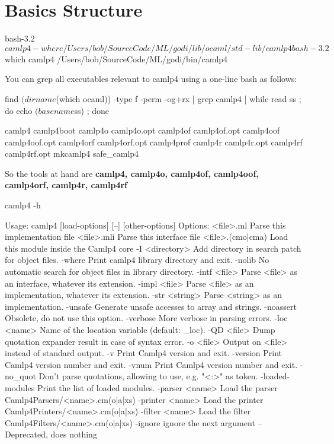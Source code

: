 \section{Basics Structure}


\begin{alternate}
bash-3.2$ camlp4 -where
/Users/bob/SourceCode/ML/godi/lib/ocaml/std-lib/camlp4
bash-3.2$ which camlp4
/Users/bob/SourceCode/ML/godi/bin/camlp4
\end{alternate}


You can grep all executables relevant to camlp4 using a one-line bash
as follows:
\begin{bluetext}
find $(dirname $(which ocaml)) -type f -perm -og+rx | grep camlp4 |
while read ss ; do echo $(basename $ss) ; done
\end{bluetext}

\begin{bluetext}  
camlp4
camlp4boot
camlp4o
camlp4o.opt
camlp4of
camlp4of.opt
camlp4oof
camlp4oof.opt
camlp4orf
camlp4orf.opt
camlp4prof
camlp4r
camlp4r.opt
camlp4rf
camlp4rf.opt
mkcamlp4
safe_camlp4
\end{bluetext}

So the tools at hand are \textbf{camlp4, camlp4o, camlp4of, camlp4oof,
  camlp4orf, camlp4r, camlp4rf }

\begin{bluetext}
camlp4 -h

Usage: camlp4 [load-options] [--] [other-options]
Options:
<file>.ml        Parse this implementation file
<file>.mli       Parse this interface file
<file>.(cmo|cma) Load this module inside the Camlp4 core
  -I <directory>   Add directory in search patch for object files.
  -where           Print camlp4 library directory and exit.
  -nolib           No automatic search for object files in library directory.
  -intf <file>     Parse <file> as an interface, whatever its extension.
  -impl <file>     Parse <file> as an implementation, whatever its extension.
  -str <string>    Parse <string> as an implementation.
  -unsafe          Generate unsafe accesses to array and strings.
  -noassert        Obsolete, do not use this option.
  -verbose         More verbose in parsing errors.
  -loc <name>      Name of the location variable (default: _loc).
  -QD <file>       Dump quotation expander result in case of syntax error.
  -o <file>        Output on <file> instead of standard output.
  -v               Print Camlp4 version and exit.
  -version         Print Camlp4 version number and exit.
  -vnum            Print Camlp4 version number and exit.
  -no_quot         Don't parse quotations, allowing to use, e.g. "<:>" as token.
  -loaded-modules  Print the list of loaded modules.
  -parser <name>   Load the parser Camlp4Parsers/<name>.cm(o|a|xs)
  -printer <name>  Load the printer Camlp4Printers/<name>.cm(o|a|xs)
  -filter <name>   Load the filter Camlp4Filters/<name>.cm(o|a|xs)
  -ignore          ignore the next argument
  --               Deprecated, does nothing    
\end{bluetext}

